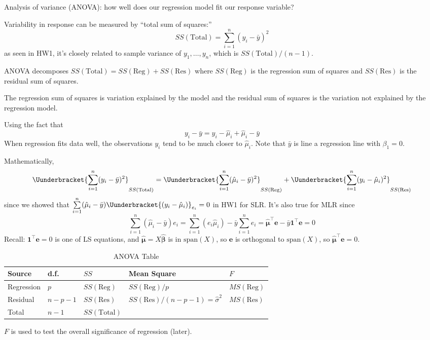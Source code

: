 Analysis of variance (ANOVA): how well
does our regression model fit our
response variable?

Variability in response can be measured by
``total sum of squares:''
\[ SS(\text{Total}) =
    \sum\limits_{i=1}^{n} (y_i-\bar{y})^2 \]
as seen in HW1, it's closely related to
sample variance of $ y_1,\ldots,y_n $,
which is $ SS(\text{Total})/(n-1) $.

ANOVA decomposes $ SS(\text{Total})=SS(\text{Reg})+SS(\text{Res}) $
where $ SS(\text{Reg}) $ is the regression sum of squares
and $ SS(\text{Res}) $ is the residual sum of squares.

The regression sum of squares is variation explained by
the model
and the residual sum of squares is the variation not
explained by the regression model.

Using the fact that
\[ y_i-\bar{y}=y_i-\hat{\mu}_i+\hat{\mu}_i-\bar{y} \]
When regression fits data well,
the observations $ y_i $ tend to be much closer to $ \hat{\mu}_i $.
Note that $ \bar{y} $ is line a regression line with $ \beta_1=0 $.

Mathematically,
\[ \Uunderbracket{\sum\limits_{i=1}^{n} (y_i-\bar{y})^2}_{SS(\text{Total})}
    =\Uunderbracket{\sum\limits_{i=1}^{n} (\hat{\mu}_i-\bar{y})^2}_{SS(\text{Reg})}+
    \Uunderbracket{\sum\limits_{i=1}^{n} (y_i-\hat{\mu}_i)^2}_{SS(\text{Res})} \]
since we showed that $ \sum\limits_{i=1}^{n}(\hat{\mu}_i-\bar{y})
    \Uunderbracket{(y_i-\hat{\mu}_i)}_{e_i}=0 $ in HW1 for SLR\@.
It's also true for MLR since
\[ \sum\limits_{i=1}^{n} (\hat{\mu}_i-\bar{y})e_i=
    \sum\limits_{i=1}^{n} (e_i\hat{\mu}_i)-\bar{y}\sum\limits_{i=1}^{n} e_i
    =\hat{\symbf{\mu}}^\top\symbf{e}-\bar{y}\symbf{1}^\top\symbf{e}=0 \]
Recall: $ \symbf{1}^\top\symbf{e}=0 $ is one of LS equations,
and $ \hat{\symbf{\mu}}=X\hat{\symbf{\beta}} $ is in $ \text{span}(X) $,
so $ \symbf{e} $ is orthogonal to $ \text{span}(X) $,
so $ \hat{\symbf{\mu}}^\top\symbf{e}=0 $.

\begin{table}[H]
    \centering
    \caption{ANOVA Table}
    \begin{tabu} to 0.9\textwidth {Y[0.5]YYY[2]Y}
        \toprule
        Source     & d.f.      & $ SS $               & Mean Square                               & $ F $              \\
        \midrule
        Regression & $ p $     & $ SS(\text{Reg}) $   & $ SS(\text{Reg})/p $                      & $ MS(\text{Reg}) $ \\
        Residual   & $ n-p-1 $ & $ SS(\text{Res}) $   & $ SS(\text{Res})/(n-p-1)=\hat{\sigma}^2 $ & $ MS(\text{Res}) $ \\
        \midrule
        Total      & $ n-1 $   & $ SS(\text{Total}) $                                                                  \\
        \bottomrule
    \end{tabu}
\end{table}
$ F $ is used to test the overall significance of regression (later).

